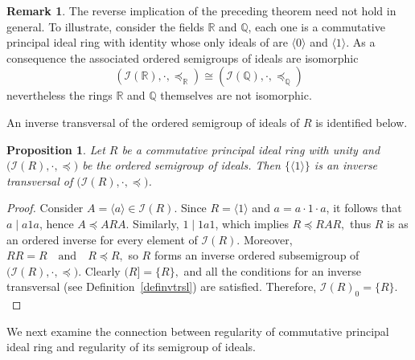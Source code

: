 \documentclass[12pt,a4paper]{amsart}
\theoremstyle{plain}
\newtheorem{proposition}[theorem]{Proposition}
\theoremstyle{definition}
\newtheorem{remark}[theorem]{Remark}
\begin{document}
\begin{remark}
The reverse implication of the preceding theorem need not hold in general.
To illustrate, consider the fields $\mathbb{R}$ and $\mathbb{Q}$, each one is a commutative principal ideal ring with identity whose only ideals of are
$\langle 0 \rangle $ and $\langle 1 \rangle$.
As a consequence the associated ordered semigroups of ideals are isomorphic
\[
(\mathcal{I}(\mathbb{R}), \cdot, \preccurlyeq_{\mathbb{R}})
\cong
(\mathcal{I}(\mathbb{Q}), \cdot, \preccurlyeq_{\mathbb{Q}})
\]
nevertheless the rings $\mathbb{R}$ and $\mathbb{Q}$ themselves are not isomorphic.
\end{remark}
An inverse transversal of the ordered semigroup of ideals of $R$ is identified below.

\begin{proposition}
	Let $R$ be a commutative principal ideal ring with unity and 
	$\big(\mathcal{I}(R), \cdot, \preccurlyeq\big)$ be the ordered semigroup of
	ideals. Then $\{ \langle 1\rangle \}$ is an inverse transversal of
	$\big(\mathcal{I}(R), \cdot, \preccurlyeq\big)$.
\end{proposition}

\begin{proof}
	Consider $ A = \langle a\rangle \in \mathcal{I}(R)$. Since $R = \langle 1 \rangle$ and 
	$a = a \cdot 1 \cdot a$, it follows that $a \mid a1a$, hence $A \preccurlyeq ARA.$
	Similarly, $1 \mid 1a1$, which implies $R \preccurlyeq RAR,$ thus $R$ is as an ordered inverse for every element of $\mathcal{I}(R)$. 	
	Moreover, $	RR = R \quad \text{and} \quad R \preccurlyeq R,$
	so $R$ forms an inverse ordered subsemigroup of $\big(\mathcal{I}(R), \cdot, \preccurlyeq\big)$. Clearly $(R] = \{R\},$ and all the conditions for an inverse transversal (see Definition~\ref{definvtrsl}) are satisfied. Therefore,
$	\mathcal{I}(R)_0 = \{R\}.$
\end{proof}

We next examine the connection between regularity of commutative
principal ideal ring and regularity of its semigroup of ideals.
\end{document}
